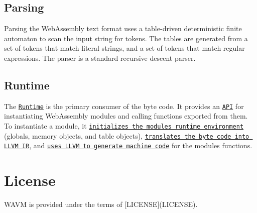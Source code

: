 \subsection*{Parsing}

Parsing the Web\+Assembly text format uses a table-\/driven deterministic finite automaton to scan the input string for tokens. The tables are generated from a set of tokens that match literal strings, and a set of tokens that match regular expressions. The parser is a standard recursive descent parser.

\subsection*{Runtime}

The \href{Source/Runtime/}{\tt Runtime} is the primary consumer of the byte code. It provides an \href{Include/Runtime/Runtime.h}{\tt A\+PI} for instantiating Web\+Assembly modules and calling functions exported from them. To instantiate a module, it \href{Source/Runtime/ModuleInstance.cpp}{\tt initializes the module\textquotesingle{}s runtime environment} (globals, memory objects, and table objects), \href{Source/Runtime/LLVMEmitIR.cpp}{\tt translates the byte code into L\+L\+VM IR}, and \href{Source/Runtime/LLVMJIT.cpp}{\tt uses L\+L\+VM to generate machine code} for the module\textquotesingle{}s functions.

\section*{License}

W\+A\+VM is provided under the terms of \mbox{[}L\+I\+C\+E\+N\+SE\mbox{]}(L\+I\+C\+E\+N\+SE). 